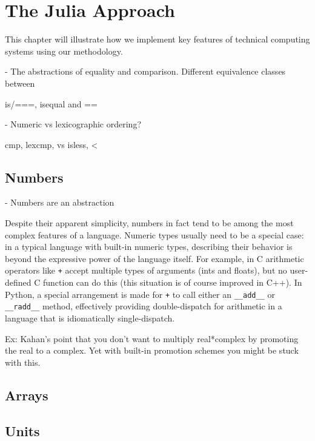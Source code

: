 \chapter{The Julia Approach}

This chapter will illustrate how we implement key features of technical computing
systems using our methodology.

- The abstractions of equality and comparison. Different equivalence classes between

is/===, isequal and ==

- Numeric vs lexicographic ordering?

cmp, lexcmp, vs isless, <

\section{Numbers}

- Numbers are an abstraction 

Despite their apparent simplicity, numbers in fact tend to be among the most
complex features of a language. Numeric types usually need to be a special
case: in a typical language with built-in numeric types, describing their
behavior is beyond the expressive power of the language itself. For example,
in C arithmetic operators like \texttt{+} accept multiple types of arguments
(ints and floats), but no user-defined C function can do this (this situation
is of course improved in C++). In Python, a special arrangement is made for
\texttt{+} to call either an \texttt{\_\_add\_\_} or \texttt{\_\_radd\_\_} method, effectively
providing double-dispatch for arithmetic in a language that is idiomatically
single-dispatch.

Ex: Kahan's point that you don't want to multiply real*complex by
promoting the real to a complex. Yet with built-in promotion schemes
you might be stuck with this.


\section{Arrays}



\section{Units}

